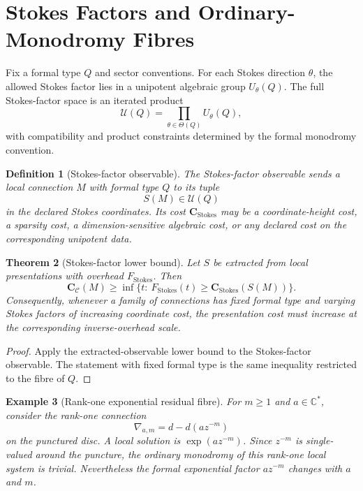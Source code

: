 \documentclass[11pt]{article}
\newtheorem{theorem}{Theorem}[section]
\newtheorem{definition}[theorem]{Definition}
\newtheorem{example}[theorem]{Example}
\begin{document}
\section{Stokes Factors and Ordinary-Monodromy Fibres}

Fix a formal type \(Q\) and sector conventions.  For each Stokes direction \(\theta\), the allowed Stokes factor lies in a unipotent algebraic group \(U_{\theta}(Q)\).  The full Stokes-factor space is an iterated product
\[
\mathcal U(Q)=\prod_{\theta\in\Theta(Q)} U_{\theta}(Q),
\]
with compatibility and product constraints determined by the formal monodromy convention.

\begin{definition}[Stokes-factor observable]
The Stokes-factor observable sends a local connection \(M\) with formal type \(Q\) to its tuple
\[
S(M)\in \mathcal U(Q)
\]
in the declared Stokes coordinates.  Its cost \(\mathbf C_{\operatorname{Stokes}}\) may be a coordinate-height cost, a sparsity cost, a dimension-sensitive algebraic cost, or any declared cost on the corresponding unipotent data.
\end{definition}

\begin{theorem}[Stokes-factor lower bound]
Let \(S\) be extracted from local presentations with overhead \(F_{\operatorname{Stokes}}\).  Then
\[
\mathbf C_{\mathcal C}(M)
\ge
\inf\{t:\ F_{\operatorname{Stokes}}(t)\ge
\mathbf C_{\operatorname{Stokes}}(S(M))\}.
\]
Consequently, whenever a family of connections has fixed formal type and varying Stokes factors of increasing coordinate cost, the presentation cost must increase at the corresponding inverse-overhead scale.
\end{theorem}

\begin{proof}
Apply the extracted-observable lower bound to the Stokes-factor observable.  The statement with fixed formal type is the same inequality restricted to the fibre of \(Q\).
\end{proof}

\begin{example}[Rank-one exponential residual fibre]
For \(m\ge1\) and \(a\in\mathbb C^{\ast}\), consider the rank-one connection
\[
\nabla_{a,m}=d-d(a z^{-m})
\]
on the punctured disc.  A local solution is \(\exp(a z^{-m})\).  Since \(z^{-m}\) is single-valued around the puncture, the ordinary monodromy of this rank-one local system is trivial.  Nevertheless the formal exponential factor \(a z^{-m}\) changes with \(a\) and \(m\).
\end{example}
\end{document}
